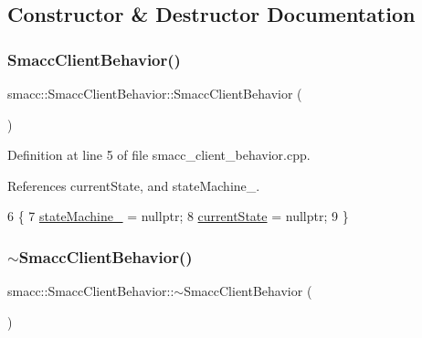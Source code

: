 \subsection{Constructor \& Destructor Documentation}
\mbox{\label{classsmacc_1_1SmaccClientBehavior_a5fbea298db572d6c7558bfd1a65a942b}} 
\subsubsection{\texorpdfstring{Smacc\+Client\+Behavior()}{SmaccClientBehavior()}}
{\footnotesize\ttfamily smacc\+::\+Smacc\+Client\+Behavior\+::\+Smacc\+Client\+Behavior (\begin{DoxyParamCaption}{ }\end{DoxyParamCaption})}



Definition at line 5 of file smacc\+\_\+client\+\_\+behavior.\+cpp.



References current\+State, and state\+Machine\+\_\+.


\begin{DoxyCode}
6 \{
7     \hyperlink{classsmacc_1_1SmaccClientBehavior_a7950b5684d6de0a8e8959c0936ce9a19}{stateMachine\_} = \textcolor{keyword}{nullptr};
8     \hyperlink{classsmacc_1_1SmaccClientBehavior_af76fc9b877542ed5caf033f820c107d0}{currentState} = \textcolor{keyword}{nullptr};
9 \}
\end{DoxyCode}
\mbox{\label{classsmacc_1_1SmaccClientBehavior_a93dbf03b9c76a580c2de47d5bef7de0f}} 
\subsubsection{\texorpdfstring{$\sim$\+Smacc\+Client\+Behavior()}{~SmaccClientBehavior()}}
{\footnotesize\ttfamily smacc\+::\+Smacc\+Client\+Behavior\+::$\sim$\+Smacc\+Client\+Behavior (\begin{DoxyParamCaption}{ }\end{DoxyParamCaption})\hspace{0.3cm}{\ttfamily [virtual]}}



